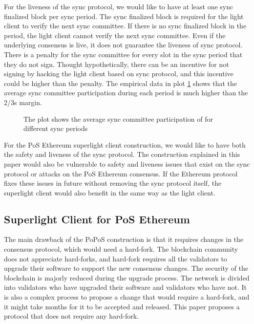 For the liveness of the sync protocol, we would like to have at least one sync finalized block per sync period. 
The sync finalized block is required for the light client to verify the next sync committee. 
If there is no sync finalized block in the period, the light client cannot verify the next sync committee. 
Even if the underlying consensus is live, it does not guarantee the liveness of sync protocol. 
There is a penalty for the sync committee for every slot in the sync period that they do not sign. 
Thought hypothetically, there can be an incentive for not signing by hacking the light client based on sync protocol, and this incentive could be higher than the penalty. 
The empirical data in plot \ref{fig:committee-participation} shows that the average sync committee participation during each period is much higher than the 2/3s margin.
  
\begin{figure}[h!]
    \begin{center}
        
    \end{center}
    \caption{The plot shows the average sync committee participation of for different sync periods}
    \label{fig:committee-participation}
\end{figure}

For the PoS Ethereum superlight client construction, we would like to have both the safety and liveness of the sync protocol.
The construction explained in this paper would also be vulnerable to safety and liveness issues that exist on the sync protocol or attacks on the PoS Ethereum consensus\cite{DBLP:journals/corr/abs-2110-10086,AttackOnEthereum}. 
If the Ethereum protocol fixes these issues in future without removing the sync protocol itself, the superlight client would also benefit in the same way as the light client. 
  
\subsection{Superlight Client for PoS Ethereum}
The main drawback of the PoPoS construction is that it requires changes in the consensus protocol, which would need a hard-fork. 
The blockchain community does not appreciate hard-forks, and hard-fork requires all the validators to upgrade their software to support the new consensus changes. 
The security of the blockchain is majorly reduced during the upgrade process. 
The network is divided into validators who have upgraded their software and validators who have not. 
It is also a complex process to propose a change that would require a hard-fork, and it might take months for it to be accepted and released.
This paper proposes a protocol that does not require any hard-fork. 

